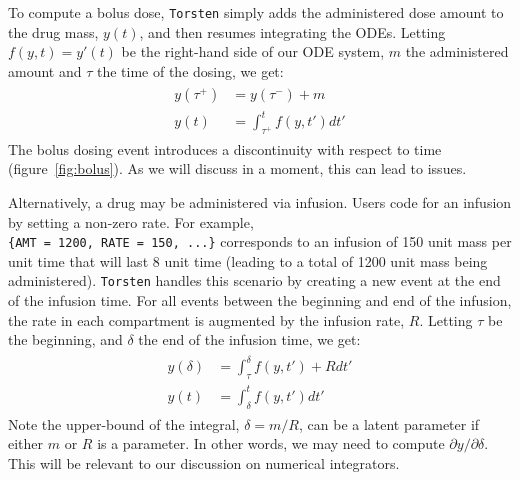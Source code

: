 \documentclass[11pt]{article}
\begin{document}
To compute a bolus dose, \texttt{Torsten} simply adds the administered dose amount to the drug 
mass, $y(t)$, and then resumes integrating the ODEs. Letting $f(y, t) = y'(t)$ be the right-hand 
side of our ODE system, $m$ the administered amount and $\tau$ the time of the dosing, we get:
%
\begin{eqnarray}
  \begin{aligned}
  y(\tau ^ +) &= y(\tau^-) + m \\
  y(t) &= \int_{\tau ^ +} ^ t f(y, t') dt'
  \end{aligned}
\end{eqnarray}
%
The bolus dosing event introduces a discontinuity with respect to time (figure~\ref{fig:bolus}).
As we will discuss in a moment, this can lead to issues.

Alternatively, a drug may be administered via infusion.
Users code for an infusion by setting a non-zero rate. For example,  \\
\hbox{\texttt{\{AMT = 1200, RATE = 150, ...\}}} corresponds to an infusion of 150 unit mass per unit
time that will last 8 unit time (leading to a total of 1200 unit mass being administered). \texttt{Torsten} handles
this scenario by creating a new event at the end of the infusion time. For all events between the
beginning and end of the infusion, the rate in each compartment is augmented by the infusion rate,
$R$. Letting $\tau$ be the beginning, and $\delta$ the end of the infusion time, we get:
%
\begin{eqnarray}
  \begin{aligned}
  y(\delta) &= \int_\tau ^ \delta f(y, t') + R dt' \\
  y(t) &= \int_\delta ^ t f(y, t') dt'
  \end{aligned}
\end{eqnarray}
%
Note the upper-bound of the integral, $\delta = m / R$, can be a latent parameter if either $m$ or
$R$ is a parameter. In other words, we may need to compute $\partial y / \partial \delta$. This will
be relevant to our discussion on numerical integrators.
\end{document}
